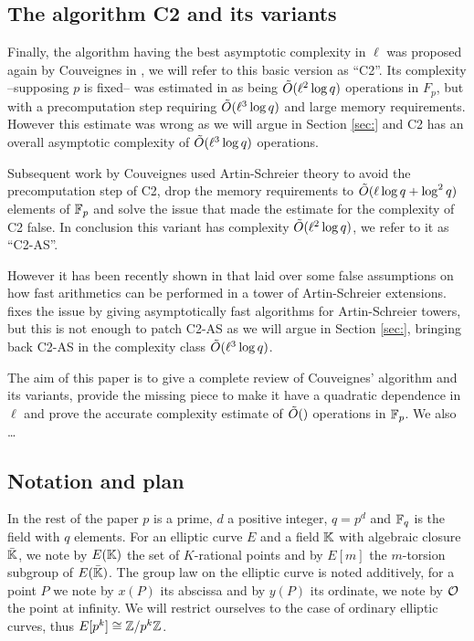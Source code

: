 \subsection{The algorithm C2 and its variants}

Finally, the algorithm having the best asymptotic complexity in $\ell$
was proposed again by Couveignes in \cite{Cou96}, we will refer to
this basic version as ``C2''. Its complexity --supposing $p$ is
fixed-- was estimated in \cite{Cou96} as being $\tilde{O}(\ell^2\log q)$
operations in $F_p$, but with a precomputation step requiring
$\tilde{O}(\ell^3\log q)$ and large memory requirements. However this
estimate was wrong as we will argue in Section \ref{sec:}
and C2 has an overall asymptotic complexity of $\tilde{O}(\ell^3\log q)$
operations.

Subsequent work by Couveignes used Artin-Schreier theory to avoid the
precomputation step of C2, drop the memory requirements to
$\tilde{O}(\ell\log q + \log^2 q)$ elements of $\mathbb{F}_p$ \cite{Cou00} and
solve the issue that made the estimate for the complexity of C2
false. In conclusion this variant has complexity $\tilde{O}(\ell^2\log
q)$, we refer to it as ``C2-AS''.

However it has been recently shown in \cite{DFS09} that \cite{Cou00}
laid over some false assumptions on how fast arithmetics can be
performed in a tower of Artin-Schreier extensions. \cite{DFS09} fixes
the issue by giving asymptotically fast algorithms for Artin-Schreier
towers, but this is not enough to patch C2-AS as we will argue in
Section \ref{sec:}, bringing back C2-AS in the complexity class
$\tilde{O}(\ell^3\log q)$.

The aim of this paper is to give a complete review of Couveignes'
algorithm and its variants, provide the missing piece to make it have
a quadratic dependence in $\ell$ and prove the accurate complexity
estimate of $\tilde{O}()$ operations in $\mathbb{F}_p$. We also \dots

\subsection{Notation and plan}

In the rest of the paper $p$ is a prime, $d$ a positive integer,
$q=p^d$ and $\mathbb{F}_q$ is the field with $q$ elements. For an elliptic
curve $E$ and a field $\mathbb{K}$ with algebraic closure $\bar{\mathbb{K}}$, we note
by $E(\mathbb{K})$ the set of $K$-rational points and by $E[m]$ the
$m$-torsion subgroup of $E(\bar{\mathbb{K}})$. The group law on the elliptic
curve is noted additively, for a point $P$ we note by $x(P)$ its
abscissa and by $y(P)$ its ordinate, we note by $\mathcal{O}$ the point at
infinity. We will restrict ourselves to the case of ordinary elliptic
curves, thus $E[p^k]\cong\mathbb{Z}/p^k\mathbb{Z}$.

